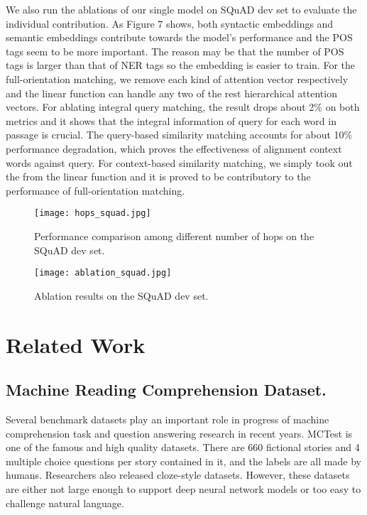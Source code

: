 \documentclass[letterpaper]{article}
\begin{document}
We also run the ablations of our single model on SQuAD dev set to evaluate the individual contribution. As Figure 7 shows, both syntactic embeddings and semantic embeddings contribute towards the model's performance and the POS tags seem to be more important. The reason may be that the number of POS tags is larger than that of NER tags so the embedding is easier to train. For the full-orientation matching, we remove each kind of attention vector respectively and the linear function can handle any two of the rest hierarchical attention vectors. For ablating integral query matching, the result drops about 2\% on both metrics and it shows that the integral information of query for each word in passage is crucial. The query-based similarity matching accounts for about 10\% performance degradation, which proves the effectiveness of alignment context words against query. For context-based similarity matching, we simply took out the 
 from the linear function and it is proved to be contributory to the performance of full-orientation matching.



\begin{figure}[htbp]
  \begin{center}
  \texttt{[image: hops\_squad.jpg]}
  \caption{Performance comparison among different number of hops on the SQuAD dev set.}
  \end{center}
\end{figure}

\begin{figure}[htbp]
  \begin{center}
  \texttt{[image: ablation\_squad.jpg]}
  \caption{Ablation results on the SQuAD dev set.}
  \end{center}
\end{figure}



\section{Related Work}
\subsection{Machine Reading Comprehension Dataset. }
Several benchmark datasets play an important role in progress of machine comprehension task and question answering research in recent years. MCTest\citep{richardson2013mctest} is one of the famous and high quality datasets. There are 660 fictional stories and 4 multiple choice questions per story contained in it, and the labels are all made by humans. Researchers also released cloze-style datasets\citep{hill2015goldilocks,hermann2015teaching,onishi2016did,paperno2016lambada}. However, these datasets are either not large enough to support deep neural network models or too easy to challenge natural language.
\end{document}
